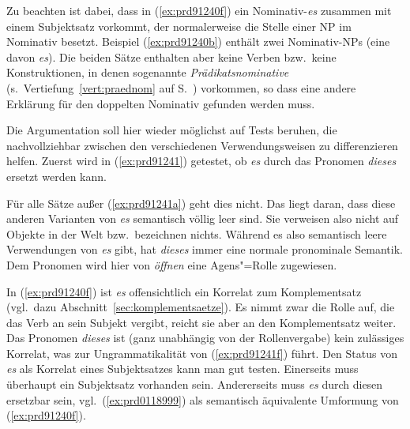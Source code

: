 Zu beachten ist dabei, dass in (\ref{ex:prd91240f}) ein Nominativ-\textit{es} zusammen mit einem Subjektsatz vorkommt, der normalerweise die Stelle einer NP im Nominativ besetzt.
Beispiel (\ref{ex:prd91240b}) enthält zwei Nominativ-NPs (eine davon \textit{es}). 
Die beiden Sätze enthalten aber keine Verben bzw.\ keine Konstruktionen, in denen sogenannte \textit{Prädikatsnominative} (s.\ Vertiefung~\ref{vert:praednom} auf S.~\pageref{vert:praednom}) vorkommen, so dass eine andere Erklärung für den doppelten Nominativ gefunden werden muss.

Die Argumentation soll hier wieder möglichst auf Tests beruhen, die nachvollziehbar zwischen den verschiedenen Verwendungsweisen zu differenzieren helfen.
Zuerst wird in (\ref{ex:prd91241}) getestet, ob \textit{es} durch das Pronomen \textit{dieses} ersetzt werden kann.

\begin{exe}
  \ex\label{ex:prd91241}
  \begin{xlist}
  \end{xlist}
\end{exe}

Für alle Sätze außer (\ref{ex:prd91241a}) geht dies nicht.
Das liegt daran, dass diese anderen Varianten von \textit{es} semantisch völlig leer sind.
Sie verweisen also nicht auf Objekte in der Welt bzw.\ bezeichnen nichts.
Während es also semantisch leere Verwendungen von \textit{es} gibt, hat \textit{dieses} immer eine normale pronominale Semantik.
Dem Pronomen wird hier von \textit{öffnen} eine Agens"=Rolle zugewiesen.

In (\ref{ex:prd91240f}) ist \textit{es} offensichtlich ein Korrelat zum Komplementsatz (vgl.\ dazu Abschnitt~\ref{sec:komplementsaetze}).
Es nimmt zwar die Rolle auf, die das Verb an sein Subjekt vergibt, reicht sie aber an den Komplementsatz weiter.
Das Pronomen \textit{dieses} ist (ganz unabhängig von der Rollenvergabe) kein zulässiges Korrelat, was zur Ungrammatikalität von (\ref{ex:prd91241f}) führt.
Den Status von \textit{es} als Korrelat eines Subjektsatzes kann man gut testen.
Einerseits muss überhaupt ein Subjektsatz vorhanden sein.
Andererseits muss \textit{es} durch diesen ersetzbar sein, vgl.\ (\ref{ex:prd0118999}) als semantisch äquivalente Umformung von (\ref{ex:prd91240f}).

